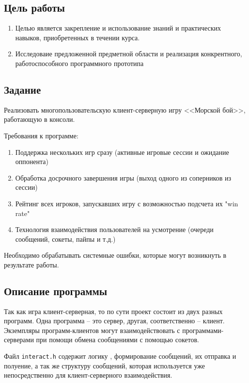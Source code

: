 \documentclass[12pt]{article}
\begin{document}
\subsection*{Цель работы}
\begin{enumerate}
    \item Целью является закрепление и использование знаний и практических навыков, приобретенных в течении курса. 
    \item Исследоваие предложенной предметной области и реализация конкрентного, работоспособного программного прототипа

\end{enumerate}


\subsection*{Задание}
Реализовать многопользовательскую клиент-серверную игру <<Морской бой>>, работающую в консоли.

Требования к программе:
\begin{enumerate}
    \item Поддержка нескольких игр сразу (активные игровые сессии и ожидание оппонента)
    \item Обработка досрочного завершения игры (выход одного из соперников из сессии)
    \item Рейтинг всех игроков, запускавших игру с возможностью подсчета их "win rate"
    \item Технология взаимодействия пользователей на усмотрение (очереди сообщений, сокеты, пайпы и т.д.)
\end{enumerate}

Необходимо обрабатывать системные ошибки, которые могут возникнуть в результате работы.

\subsection*{Описание программы}

Так как игра клиент-серверная, то по сути проект состоит из двух разных программ.
Одна программа -- это сервер, другая, соответственно -- клиент. Экземпляры программ-клиентов могут взаимодействовать с программами-серверами при помощи обмена сообщениями с помощью сокетов. 

Файл \verb|interact.h| содержит логику , формирование сообщений, их отправка и полуение, а так же структуру сообщений, которая используется уже непосредственно для  клиент-серверного взаимодействия.
\end{document}

